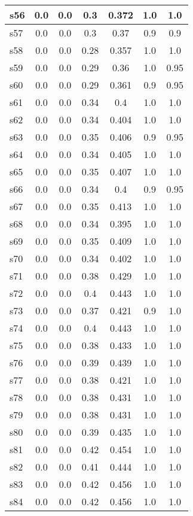 \documentclass{article}
\begin{document}
\begin{tabular}{|l|c|c|c|c|c|c|}
\hline
s56 &0.0 & 0.0 & 0.3 & 0.372 & 1.0 & 1.0\\
\hline
s57 &0.0 & 0.0 & 0.3 & 0.37 & 0.9 & 0.9\\
\hline
s58 &0.0 & 0.0 & 0.28 & 0.357 & 1.0 & 1.0\\
\hline
s59 &0.0 & 0.0 & 0.29 & 0.36 & 1.0 & 0.95\\
\hline
s60 &0.0 & 0.0 & 0.29 & 0.361 & 0.9 & 0.95\\
\hline
s61 &0.0 & 0.0 & 0.34 & 0.4 & 1.0 & 1.0\\
\hline
s62 &0.0 & 0.0 & 0.34 & 0.404 & 1.0 & 1.0\\
\hline
s63 &0.0 & 0.0 & 0.35 & 0.406 & 0.9 & 0.95\\
\hline
s64 &0.0 & 0.0 & 0.34 & 0.405 & 1.0 & 1.0\\
\hline
s65 &0.0 & 0.0 & 0.35 & 0.407 & 1.0 & 1.0\\
\hline
s66 &0.0 & 0.0 & 0.34 & 0.4 & 0.9 & 0.95\\
\hline
s67 &0.0 & 0.0 & 0.35 & 0.413 & 1.0 & 1.0\\
\hline
s68 &0.0 & 0.0 & 0.34 & 0.395 & 1.0 & 1.0\\
\hline
s69 &0.0 & 0.0 & 0.35 & 0.409 & 1.0 & 1.0\\
\hline
s70 &0.0 & 0.0 & 0.34 & 0.402 & 1.0 & 1.0\\
\hline
s71 &0.0 & 0.0 & 0.38 & 0.429 & 1.0 & 1.0\\
\hline
s72 &0.0 & 0.0 & 0.4 & 0.443 & 1.0 & 1.0\\
\hline
s73 &0.0 & 0.0 & 0.37 & 0.421 & 0.9 & 1.0\\
\hline
s74 &0.0 & 0.0 & 0.4 & 0.443 & 1.0 & 1.0\\
\hline
s75 &0.0 & 0.0 & 0.38 & 0.433 & 1.0 & 1.0\\
\hline
s76 &0.0 & 0.0 & 0.39 & 0.439 & 1.0 & 1.0\\
\hline
s77 &0.0 & 0.0 & 0.38 & 0.421 & 1.0 & 1.0\\
\hline
s78 &0.0 & 0.0 & 0.38 & 0.431 & 1.0 & 1.0\\
\hline
s79 &0.0 & 0.0 & 0.38 & 0.431 & 1.0 & 1.0\\
\hline
s80 &0.0 & 0.0 & 0.39 & 0.435 & 1.0 & 1.0\\
\hline
s81 &0.0 & 0.0 & 0.42 & 0.454 & 1.0 & 1.0\\
\hline
s82 &0.0 & 0.0 & 0.41 & 0.444 & 1.0 & 1.0\\
\hline
s83 &0.0 & 0.0 & 0.42 & 0.456 & 1.0 & 1.0\\
\hline
s84 &0.0 & 0.0 & 0.42 & 0.456 & 1.0 & 1.0\\

\end{tabular}
\end{document}
